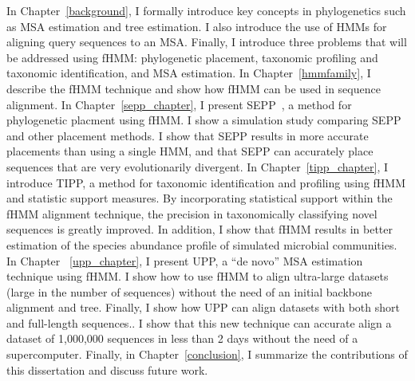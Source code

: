 In Chapter~\ref{background}, I formally introduce key concepts in phylogenetics such as MSA estimation and tree estimation.  I also introduce the use of HMMs for aligning query sequences to an MSA.  Finally, I introduce three problems that will be addressed using  fHMM: phylogenetic placement, taxonomic profiling and taxonomic identification, and MSA estimation.  In Chapter~\ref{hmmfamily}, I describe the fHMM technique and show how fHMM can be used in sequence alignment.  In Chapter~\ref{sepp_chapter}, I present SEPP~\cite{todo}, a method for phylogenetic placment using fHMM.  I show a simulation study comparing SEPP and other placement methods.  I show that SEPP results in more accurate placements than using a single HMM, and that SEPP can accurately place sequences that are very evolutionarily divergent.  In Chapter~\ref{tipp_chapter}, I introduce TIPP, a method for taxonomic identification and profiling using fHMM and statistic support measures.  By incorporating statistical support within the fHMM alignment technique, the precision in taxonomically classifying novel sequences is greatly improved.  In addition, I show that fHMM results in better estimation of the species abundance profile of simulated microbial communities.  In Chapter ~\ref{upp_chapter}, I present UPP, a ``de novo'' MSA estimation technique using fHMM.  I show how to use fHMM to align ultra-large datasets (large in the number of sequences) without the need of an initial backbone alignment and tree.  Finally, I show how UPP can align datasets with both short and full-length sequences..  I show that this new technique can accurate align a dataset of 1,000,000 sequences in less than 2 days without the need of a supercomputer.  Finally, in Chapter~\ref{conclusion}, I summarize the contributions of this dissertation and discuss future work.





